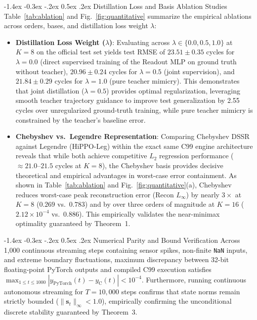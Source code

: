 \documentclass[10pt,twocolumn,a4paper]{article}
\makeatletter
\renewcommand\subsection{\@startsection{subsection}{2}{\z@}%
  {-1.4ex \@plus -0.3ex \@minus -.2ex}%
  {0.5ex \@plus .2ex}%
  {\normalfont\normalsize\bfseries}}
\theoremstyle{plain}
\theoremstyle{definition}
\makeatother
\begin{document}
\subsection{Distillation Loss and Basis Ablation Studies}
Table~\ref{tab:ablation} and Fig.~\ref{fig:quantitative} summarize the empirical ablations across orders, bases, and distillation loss weight $\lambda$:
\begin{itemize}
    \item \textbf{Distillation Loss Weight ($\lambda$)}: Evaluating across $\lambda \in \{0.0, 0.5, 1.0\}$ at $K=8$ on the official test set yields test RMSE of $23.51 \pm 0.35$ cycles for $\lambda = 0.0$ (direct supervised training of the Readout MLP on ground truth without teacher), $20.96 \pm 0.24$ cycles for $\lambda = 0.5$ (joint supervision), and $21.84 \pm 0.29$ cycles for $\lambda = 1.0$ (pure teacher mimicry). This demonstrates that joint distillation ($\lambda = 0.5$) provides optimal regularization, leveraging smooth teacher trajectory guidance to improve test generalization by 2.55 cycles over unregularized ground-truth training, while pure teacher mimicry is constrained by the teacher's baseline error.
    \item \textbf{Chebyshev vs.\ Legendre Representation}: Comparing Chebyshev DSSR against Legendre (HiPPO-Leg) within the exact same C99 engine architecture reveals that while both achieve competitive $L_2$ regression performance ($\approx 21.0$--$21.5$ cycles at $K=8$), the Chebyshev basis provides decisive theoretical and empirical advantages in worst-case error containment. As shown in Table~\ref{tab:ablation} and Fig.~\ref{fig:quantitative}(a), Chebyshev reduces worst-case peak reconstruction error ($\text{Recon } L_\infty$) by nearly $3\times$ at $K=8$ ($0.269$ vs.\ $0.783$) and by over three orders of magnitude at $K=16$ ($2.12 \times 10^{-4}$ vs.\ $0.886$). This empirically validates the near-minimax optimality guaranteed by Theorem~1.
\end{itemize}

\subsection{Numerical Parity and Bound Verification}
Across 1,000 continuous streaming steps containing sensor spikes, non-finite \texttt{NaN} inputs, and extreme boundary fluctuations, maximum discrepancy between 32-bit floating-point PyTorch outputs and compiled C99 execution satisfies $\max_{1 \le t \le 1000} |y_{\mathrm{PyTorch}}(t) - y_{\mathrm{C}}(t)| < 10^{-4}$. Furthermore, running continuous autonomous streaming for $T = 10{,}000$ steps confirms that state norms remain strictly bounded ($\|\mathbf{s}_t\|_\infty < 1.0$), empirically confirming the unconditional discrete stability guaranteed by Theorem~3.
\end{document}
